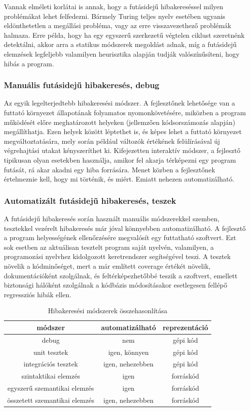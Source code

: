 \documentclass[a4paper,12pt]{report}
\begin{document}
Vannak elméleti korlátai is annak, hogy a futásidejű hibakereséssel milyen problémákat lehet felfedezni. Bármely Turing teljes nyelv esetében ugyanis eldönthetetlen a megállási probléma, vagy az erre visszavezethező problémák halmaza. Erre példa, hogy ha egy egyszerű szerkezetű végtelen ciklust szeretnénk detektálni, akkor arra a statikus módszerek megoldást adnak, míg a futásidejű elemzések legfeljebb valamilyen heurisztika alapján tudják valószínűsíteni, hogy hibás a program.

\subsubsection{Manuális futásidejű hibakeresés, debug}
Az egyik legelterjedtebb hibakeresési módszer. A fejlesztőnek lehetősége van a futtató környezet állapotának folyamatos nyomonkövetésére, miközben a program működését előre meghatározott helyeken (jellemzően kódsorszámozás alapján) megállíthatja. Ezen helyek között léptethet is, és képes lehet a futtató környezet megváltoztatására, mely során például változók értékének felülírásával új végrehajtási utakat kényszeríthet ki. Kifejezetten interaktív módszer, a fejlesztő tipikusan olyan esetekben használja, amikor fel akarja térképezni egy program futását, rá akar akadni egy hiba forrására. Menet közben a fejlesztőnek értelmeznie kell, hogy mi történik, és miért. Emiatt nehezen automatizálható.

\subsubsection{Automatizált futásidejű hibakeresés, teszek}
A futásidejű hibakeresés során használt manuális módszerekkel szemben, tesztekkel vezérelt hibakeresés már jóval könnyebben automatizálható. A fejlesztő a program helyességének ellenőrzésére megvalósít egy futtatható szoftvert. Ezt sok esetben az aktuálisan tesztelt program saját nyelvén, valamilyen, a programozási nyelvhez kidolgozott keretrendszer segítségével teszi. A tesztek növelik a kódminőséget, mert a már említett coverage értékét növelik, dokumentációként szolgálnak, és feltérképezhetőbbé teszik a szoftvert, emellett biztonsági hálóként szolgálnak a kódbázis módosításakor esetlegesen fellépő regressziós hibák ellen.


\begin{table}[h!]
\centering
\begin{tabular}{||c c c||} 
 \hline
 módszer & automatizálható & reprezentáció \\
 \hline\hline
 debug & nem & gépi kód\footnotemark[1] \\ 
 unit tesztek & igen, könnyen & gépi kód \\
 integrációs tesztek & igen, nehezebben & gépi kód \\
 szintaktikai elemzés & igen & forráskód \\ 
 egyszerű szemantikai elemzés & igen & forráskód \\
 összetett szemantikai elemzés & igen, nehezebben & forráskód \\
 \hline
\end{tabular}
\caption{Hibakeresési módszerek összehasonlítása}
\label{table:errorfindmethods}
\end{table}
\end{document}
